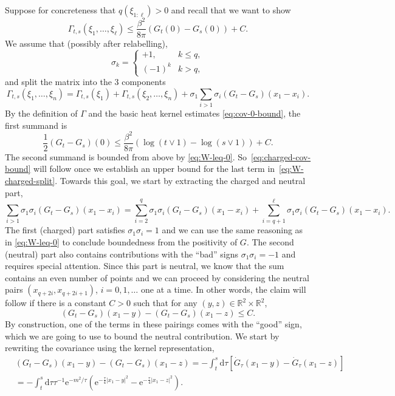 \documentclass[11pt, a4paper]{scrartcl}
\numberwithin{equation}{section}
\theoremstyle{plain}
\theoremstyle{remark}
\newcommand{\mathd}{\mathrm{d}}
\newcommand{\mathe}{\mathrm{e}}
\begin{document}
Suppose for concreteness that $q (\xi_{1 : \ell}) > 0$ and recall that we want
to show
\[ \Gamma_{t, s} (\xi_1, \ldots, \xi_{\ell}) \leqslant \frac{\beta^2}{8 \pi} (G_t
   (0) - G_s (0)) + C. \]
We assume that (possibly after relabelling),
\[ \sigma_k = \begin{cases}
     + 1, & k \leqslant q,\\
     (- 1)^k & k > q,
   \end{cases} \]
and split the matrix into the 3 components
\begin{equation}
  \Gamma_{t, s} (\xi_1, \ldots, \xi_n) = \Gamma_{t, s} (\xi_1) + \Gamma_{t, s} (\xi_2,
  \ldots, \xi_n) + \sigma_1  \sum_{i > 1} \sigma_i (G_t - G_s) (x_1 - x_i) .
  \label{eq:W-charged-split}
\end{equation}
By the definition of $\Gamma$ and the basic heat kernel estimates
\eqref{eq:cov-0-bound}, the first summand is
\[ \frac{1}{2} (G_t - G_s) (0) \leqslant \frac{\beta^2}{8 \pi} (\log (t \vee
   1) - \log (s \vee 1)) + C. \]
The second summand is bounded from above by \eqref{eq:W-leq-0}.
So~\eqref{eq:charged-cov-bound} will follow once we establish an upper bound
for the last term in~\eqref{eq:W-charged-split}. Towards this goal, we start
by extracting the charged and neutral part,
\[ \sum_{i > 1} \sigma_1 \sigma_i (G_t - G_s) (x_1 - x_i) = \sum_{i = 2}^q
   \sigma_1 \sigma_i (G_t - G_s) (x_1 - x_i) + \sum_{i = q + 1}^{\ell}
   \sigma_1 \sigma_i (G_t - G_s) (x_1 - x_i) . \]
The first (charged) part satisfies $\sigma_1 \sigma_i = 1$ and we can use the
same reasoning as in \eqref{eq:W-leq-0} to conclude boundedness from the
positivity of $G$. The second (neutral) part also contains contributions with
the ``bad'' signs $\sigma_1 \sigma_i = - 1$ and requires special attention.
Since this part is neutral, we know that the sum contains an even number of
points and we can proceed by considering the neutral pairs $(x_{q + 2 i}, x_{q
+ 2 i + 1})$, $i = 0, 1, \ldots$ one at a time. In other words, the claim will
follow if there is a constant $C > 0$ such that for any $(y, z) \in
\mathbb{R}^2 \times \mathbb{R}^2$,
\begin{equation}
  (G_t - G_s) (x_1 - y) - (G_t - G_s) (x_1 - z) \leqslant C.
  \label{eq:3pt-bound}
\end{equation}
By construction, one of the terms in these pairings comes with the ``good''
sign, which we are going to use to bound the neutral contribution. We start by
rewriting the covariance using the kernel representation,
\[ \begin{aligned}
     & (G_t - G_s) (x_1 - y) - (G_t - G_s) (x_1 - z) 
      = - \int_t^s \mathd
     \tau [\dot{G}_{\tau} (x_1 - y) - \dot{G}_{\tau} (x_1 - z)]\\
     &= - \int_t^s \mathd \tau \tau^{- 1} \mathe^{- m^2 / \tau} \left(
     \mathe^{- \frac{\tau}{4} | x_1 - y |^2} - \mathe^{- \frac{\tau}{4} | x_1 - z
     |^2} \right) .
   \end{aligned} \]
\end{document}

